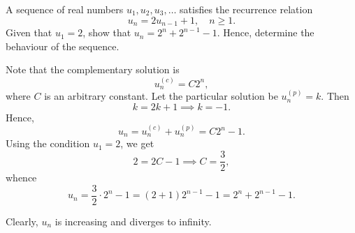 \begin{problem}
    A sequence of real numbers $u_1, u_2, u_3, \dots$ satisfies the recurrence relation \[u_n = 2u_{n-1} + 1, \quad n \geq 1.\] Given that $u_1 = 2$, show that $u_n = 2^n + 2^{n-1} - 1$. Hence, determine the behaviour of the sequence.
\end{problem}
\begin{solution}
    Note that the complementary solution is \[u_n^{(c)} = C 2^n,\] where $C$ is an arbitrary constant. Let the particular solution be $u_n^{(p)} = k$. Then \[k = 2k + 1 \implies k = -1.\] Hence, \[u_n = u_n^{(c)} + u_n^{(p)} = C 2^n - 1.\] Using the condition $u_1 = 2$, we get \[2 = 2C - 1 \implies C = \frac32,\] whence \[u_n = \frac32 \cdot 2^n - 1 = (2 + 1) 2^{n-1} - 1 = 2^n + 2^{n-1} - 1.\]

    Clearly, $u_n$ is increasing and diverges to infinity.
\end{solution}

